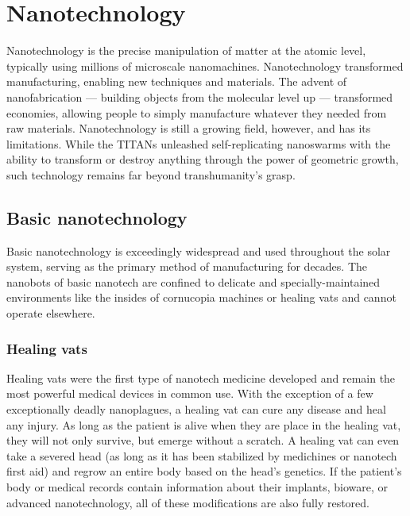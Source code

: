 \section{Nanotechnology} \label{sec:nanotech} 

Nanotechnology is the precise manipulation of matter at the atomic level, typically using millions of microscale nanomachines. Nanotechnology transformed manufacturing, enabling new techniques and materials. The advent of nanofabrication --- building objects from the molecular level up --- transformed economies, allowing people to simply manufacture whatever they needed from raw materials. Nanotechnology is still a growing field, however, and has its limitations. While the TITANs unleashed self-replicating nanoswarms with the ability to transform or destroy anything through the power of geometric growth, such technology remains far beyond transhumanity’s grasp. 



\subsection{Basic nanotechnology} \label{sec:basic-nanotech} 

Basic nanotechnology is exceedingly widespread and used throughout the solar system, serving as the primary method of manufacturing for decades. The nanobots of basic nanotech are confined to delicate and specially-maintained environments like the insides of cornucopia machines or healing vats and cannot operate elsewhere. 

\subsubsection{Healing vats} 

Healing vats were the first type of nanotech medicine developed and remain the most powerful medical devices in common use. With the exception of a few exceptionally deadly nanoplagues, a healing vat can cure any disease and heal any injury. As long as the patient is alive when they are place in the healing vat, they will not only survive, but emerge without a scratch. A healing vat can even take a severed head (as long as it has been stabilized by medichines or nanotech first aid) and regrow an entire body based on the head’s genetics. If the patient’s body or medical records contain information about their implants, bioware, or advanced nanotechnology, all of these modifications are also fully restored. 


